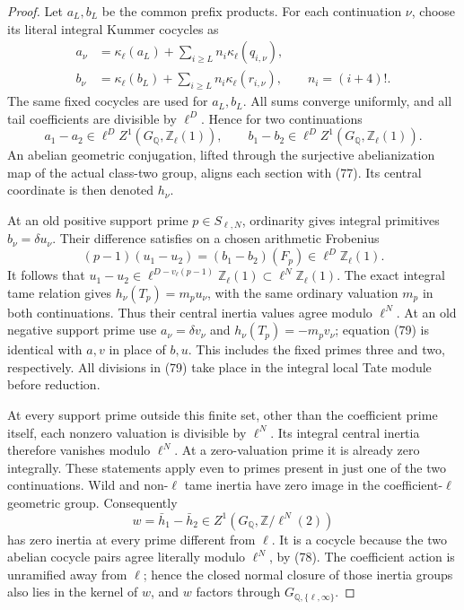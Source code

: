 \begin{proof}
Let \(a_L,b_L\) be the common prefix products.
For each continuation \(\nu\), choose its
literal integral Kummer cocycles as
\[
 \begin{split}
 a_\nu&=\kappa_\ell(a_L)+
                 \sum_{i\ge L}n_i\kappa_\ell(q_{i,\nu}),\\
 b_\nu&=\kappa_\ell(b_L)+
                 \sum_{i\ge L}n_i\kappa_\ell(r_{i,\nu}),
                 \qquad n_i=(i+4)!.
 \end{split}                                         \tag{77}
\]
The same fixed cocycles are used for \(a_L,b_L\).
All sums converge uniformly, and all tail coefficients
are divisible by \(\ell^D\). Hence for two
continuations
\[
 a_1-a_2\in\ell^D Z^1(G_{\mathbb Q},\mathbb Z_\ell(1)),
 \qquad
 b_1-b_2\in\ell^D Z^1(G_{\mathbb Q},\mathbb Z_\ell(1)).
                                                        \tag{78}
\]
An abelian geometric conjugation, lifted through
the surjective abelianization map of the actual
class-two group, aligns each section with (77).
Its central coordinate is then denoted \(h_\nu\).

At an old positive support prime \(p\in S_{\ell,N}\),
ordinarity gives integral primitives
\(b_\nu=\delta u_\nu\). Their difference satisfies
on a chosen arithmetic Frobenius
\[
 (p-1)(u_1-u_2)
       =(b_1-b_2)(F_p)\in\ell^D\mathbb Z_\ell(1).
                                                        \tag{79}
\]
It follows that
\(u_1-u_2\in\ell^{D-v_\ell(p-1)}\mathbb Z_\ell(1)
\subset\ell^N\mathbb Z_\ell(1)\).
The exact integral tame relation gives
\(h_\nu(T_p)=m_pu_\nu\), with the same ordinary
valuation \(m_p\) in both continuations. Thus
their central inertia values agree modulo
\(\ell^N\). At an old negative support prime
use \(a_\nu=\delta v_\nu\) and
\(h_\nu(T_p)=-m_pv_\nu\); equation (79) is
identical with \(a,v\) in place of \(b,u\).
This includes the fixed primes three and two,
respectively. All divisions in (79) take place
in the integral local Tate module before reduction.

At every support prime outside this finite set,
other than the coefficient prime itself, each
nonzero valuation is divisible by \(\ell^N\).
Its integral central inertia therefore vanishes
modulo \(\ell^N\). At a zero-valuation prime
it is already zero integrally. These statements
apply even to primes present in just one of the
two continuations. Wild and non-\(\ell\) tame
inertia have zero image in the coefficient-\(\ell\)
geometric group. Consequently
\[
 w=\bar h_1-\bar h_2
       \in Z^1(G_{\mathbb Q},\mathbb Z/\ell^N(2))
\]
has zero inertia at every prime different from
\(\ell\). It is a cocycle because the two
abelian cocycle pairs agree literally modulo
\(\ell^N\), by (78). The coefficient action
is unramified away from \(\ell\); hence the
closed normal closure of those inertia groups
also lies in the kernel of \(w\), and \(w\)
factors through \(G_{\mathbb Q,\{\ell,\infty\}}\).


\end{proof}
